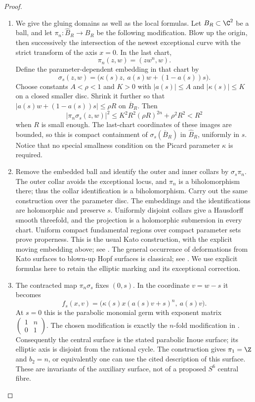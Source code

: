 \begin{proof}
\begin{enumerate}[label=\arabic*.,leftmargin=*]
\item We give the gluing domains as well as the local formulas. Let
$B_R\subset\C^2$ be a ball, and let
$\pi_n:\widehat B_R\to B_R$ be the following modification.
Blow up the origin, then successively the intersection of the newest
exceptional curve with the strict transform of the axis $x=0$.
In the last chart,
\[
 \pi_n(z,w)=(zw^n,w).
\]
Define the parameter-dependent embedding in that chart by
\[
 \sigma_s(z,w)=
       \bigl(\kappa(s)z,\ a(s)w+(1-a(s))s\bigr).
\]
Choose constants $A<\rho<1$ and $K>0$ with
$|a(s)|\le A$ and $|\kappa(s)|\le K$ on a closed smaller disc.
Shrink it further so that
$|a(s)w+(1-a(s))s|\le\rho R$ on $\overline B_R$.
Then
\[
 |\pi_n\sigma_s(z,w)|^2
 \le K^2R^2(\rho R)^{2n}+\rho^2R^2<R^2
\]
when $R$ is small enough. The last-chart coordinates of these images
are bounded, so this is compact containment of
$\sigma_s(\overline B_R)$ in $\widehat B_R$, uniformly in $s$.
Notice that no special smallness condition on the Picard parameter
$\kappa$ is required.

\item Remove the embedded ball and identify the outer and inner collars by
$\sigma_s\pi_n$. The outer collar avoids the exceptional locus, and
$\pi_n$ is a biholomorphism there; thus the collar identification is
a biholomorphism. Carry out the same construction over the parameter
disc. The embeddings and the identifications are holomorphic and
preserve $s$. Uniformly disjoint collars give a Hausdorff smooth
threefold, and the projection is a holomorphic submersion in every
chart. Uniform compact fundamental regions over compact parameter
sets prove properness. This is the usual Kato construction, with
the explicit moving embedding above; see
\citet[Section 2, pp.1351--1353]{IstratiEtAl2022Root}.
The general occurrence of deformations from Kato surfaces to
blown-up Hopf surfaces is classical; see
\citet[Introduction, pp.1750--1751]{Teleman2010AB}.
We use explicit formulas here to retain the elliptic marking and
its exceptional correction.

\item The contracted map $\pi_n\sigma_s$ fixes $(0,s)$.
In the coordinate $v=w-s$ it becomes
\[
 f_s(x,v)=
    \bigl(\kappa(s)x(a(s)v+s)^n,\ a(s)v\bigr).
\]
At $s=0$ this is the parabolic monomial germ with exponent matrix
$\left(\begin{smallmatrix}1&n\\0&1\end{smallmatrix}\right)$.
The chosen modification is exactly the $n$-fold modification in
\citet[Example 9.10, p.1386]{IstratiEtAl2022Root}.
Consequently the central surface is the stated parabolic Inoue
surface; its elliptic axis is disjoint from the rational cycle.
The construction gives $\pi_1=\Z$ and $b_2=n$, or equivalently one
can use the cited description of this surface. These are invariants
of the auxiliary surface, not of a proposed $S^6$ central fibre.


\end{enumerate}
\end{proof}
